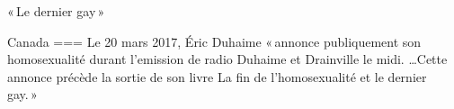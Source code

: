 « Le dernier gay »

Canada
===
Le 20 mars 2017, Éric Duhaime « annonce publiquement son homosexualité durant l’emission de radio Duhaime et Drainville le midi. …Cette annonce précède la sortie de son livre La fin de l’homosexualité et le dernier gay. »

\nocite{2025b}